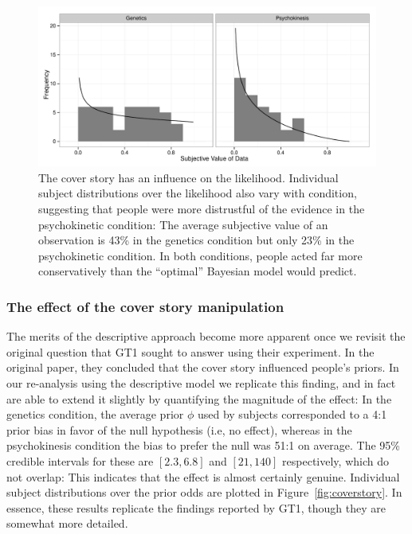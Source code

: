 \documentclass[doc,floatsintext]{apa6}
\begin{document}
\begin{figure}[]
	\centering
	\includegraphics[width=.95\textwidth]{coincidences_figures/likelihoodVariation.pdf}
	\caption{The cover story has an influence on the likelihood. Individual subject distributions over the likelihood also vary with condition, suggesting that people were more distrustful of the evidence in the {\sc psychokinetic} condition: The average subjective value of an observation is 43\% in the {\sc genetics} condition but only 23\% in the {\sc psychokinetic} condition. In both conditions, people acted far more conservatively than the ``optimal'' Bayesian model would predict.}
	\label{fig:coverstory2}
\end{figure}



%


\subsubsection*{The effect of the cover story manipulation}

The merits of the descriptive approach become more apparent once we revisit the original question that GT1 sought to answer using their experiment. In the original paper, they concluded that the cover story influenced people's priors. In our re-analysis using the descriptive model we replicate this finding, and in fact are able to extend it slightly by quantifying the magnitude of the effect: In the {\sc genetics} condition, the average prior $\phi$ used by subjects corresponded to a 4:1 prior bias in favor of the null hypothesis (i.e, no effect), whereas in the {\sc psychokinesis} condition the bias to prefer the null was 51:1 on average. The 95\% credible intervals for these are $[2.3, 6.8]$ and $[21,140]$ respectively, which do not overlap: This indicates that the effect is almost certainly genuine. Individual subject distributions over the prior odds are plotted in Figure~\ref{fig:coverstory}. In essence, these results replicate the findings reported by GT1, though they are somewhat more detailed.
\end{document}
